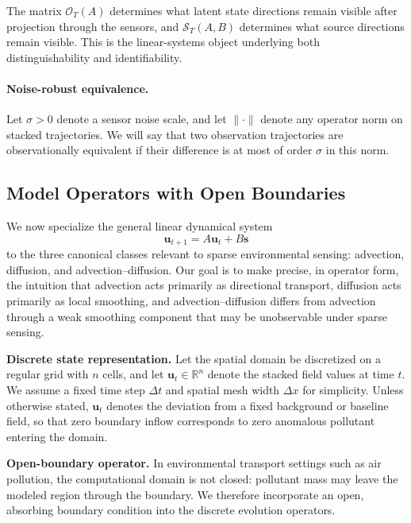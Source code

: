 The matrix $\mathcal{O}_T(A)$ determines what latent state directions remain visible after projection through the sensors, and $\mathcal{S}_T(A,B)$ determines what source directions remain visible. This is the linear-systems object underlying both distinguishability and identifiability.

\paragraph{Noise-robust equivalence.}
Let $\sigma>0$ denote a sensor noise scale, and let $\|\cdot\|$ denote any operator norm on stacked trajectories. We will say that two observation trajectories are observationally equivalent if their difference is at most of order $\sigma$ in this norm.


\subsection{Model Operators with Open Boundaries}
\label{subsec:model_ops}

We now specialize the general linear dynamical system
\begin{equation}
\mathbf{u}_{t+1} = A \mathbf{u}_t + B \mathbf{s} \nonumber
\end{equation}
to the three canonical classes relevant to sparse environmental sensing: advection, diffusion, and advection--diffusion. Our goal is to make precise, in operator form, the intuition that advection acts primarily as directional transport, diffusion acts primarily as local smoothing, and advection--diffusion differs from advection through a weak smoothing component that may be unobservable under sparse sensing.

\vspace{0.5em}
\noindent
\textbf{Discrete state representation.}
Let the spatial domain be discretized on a regular grid with $n$ cells, and let $\mathbf{u}_t \in \mathbb{R}^n$ denote the stacked field values at time $t$. We assume a fixed time step $\Delta t$ and spatial mesh width $\Delta x$ for simplicity. Unless otherwise stated, $\mathbf{u}_t$ denotes the deviation from a fixed background or baseline field, so that zero boundary inflow corresponds to zero anomalous pollutant entering the domain.

\vspace{0.5em}
\noindent
\textbf{Open-boundary operator.}
In environmental transport settings such as air pollution, the computational domain is not closed: pollutant mass may leave the modeled region through the boundary. We therefore incorporate an open, absorbing boundary condition into the discrete evolution operators.

